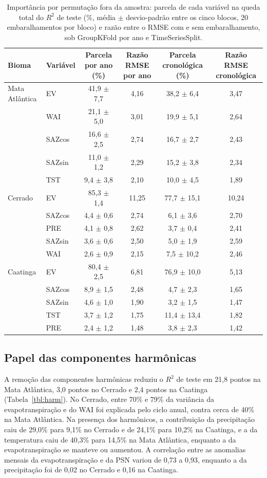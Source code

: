 \documentclass[a4paper,fleqn]{cas-dc}
\begin{document}
\begin{table}[htbp]
\caption{Importância por permutação fora da amostra: parcela de cada variável na queda total do $R^2$ de teste (\%, média $\pm$ desvio-padrão entre os cinco blocos, 20 embaralhamentos por bloco) e razão entre o RMSE com e sem embaralhamento, sob GroupKFold por ano e TimeSeriesSplit.}\label{tbl:perm}
\footnotesize
\begin{tabular*}{\tblwidth}{@{}LLCCCC@{}}
\toprule
Bioma & Variável & Parcela por ano (\%) & Razão RMSE por ano & Parcela cronológica (\%) & Razão RMSE cronológica \\
\midrule
Mata Atlântica & EV & 41,9 $\pm$ 7,7 & 4,16 & 38,2 $\pm$ 6,4 & 3,47 \\
 & WAI & 21,1 $\pm$ 5,0 & 3,01 & 19,9 $\pm$ 5,1 & 2,64 \\
 & SAZcos & 16,6 $\pm$ 2,5 & 2,74 & 16,7 $\pm$ 2,7 & 2,43 \\
 & SAZsin & 11,0 $\pm$ 1,2 & 2,29 & 15,2 $\pm$ 3,8 & 2,34 \\
 & TST & 9,4 $\pm$ 3,8 & 2,10 & 10,0 $\pm$ 4,5 & 1,89 \\
Cerrado & EV & 85,3 $\pm$ 1,4 & 11,25 & 77,7 $\pm$ 15,1 & 10,24 \\
 & SAZcos & 4,4 $\pm$ 0,6 & 2,74 & 6,1 $\pm$ 3,6 & 2,70 \\
 & PRE & 4,1 $\pm$ 0,8 & 2,62 & 3,7 $\pm$ 0,4 & 2,41 \\
 & SAZsin & 3,6 $\pm$ 0,6 & 2,50 & 5,0 $\pm$ 1,9 & 2,59 \\
 & WAI & 2,6 $\pm$ 0,9 & 2,15 & 7,5 $\pm$ 10,2 & 2,46 \\
Caatinga & EV & 80,4 $\pm$ 2,5 & 6,81 & 76,9 $\pm$ 10,0 & 5,13 \\
 & SAZcos & 8,9 $\pm$ 1,5 & 2,48 & 4,7 $\pm$ 2,3 & 1,65 \\
 & SAZsin & 4,6 $\pm$ 1,0 & 1,90 & 3,2 $\pm$ 1,5 & 1,47 \\
 & TST & 3,7 $\pm$ 1,2 & 1,75 & 11,4 $\pm$ 13,4 & 1,82 \\
 & PRE & 2,4 $\pm$ 1,2 & 1,48 & 3,8 $\pm$ 2,3 & 1,42 \\
\bottomrule
\end{tabular*}
\end{table}

\subsection{Papel das componentes harmônicas}

A remoção das componentes harmônicas reduziu o $R^2$ de teste em 21,8 pontos na Mata Atlântica, 3,0 pontos no Cerrado e 2,4 pontos na Caatinga (Tabela~\ref{tbl:harm}). No Cerrado, entre 70\% e 79\% da variância da evapotranspiração e do WAI foi explicada pelo ciclo anual, contra cerca de 40\% na Mata Atlântica. Na presença dos harmônicos, a contribuição da precipitação caiu de 29,0\% para 9,1\% no Cerrado e de 24,1\% para 10,2\% na Caatinga, e a da temperatura caiu de 40,3\% para 14,5\% na Mata Atlântica, enquanto a da evapotranspiração se manteve ou aumentou. A correlação entre as anomalias mensais da evapotranspiração e da PSN variou de 0,73 a 0,93, enquanto a da precipitação foi de 0,02 no Cerrado e 0,16 na Caatinga.
\end{document}
